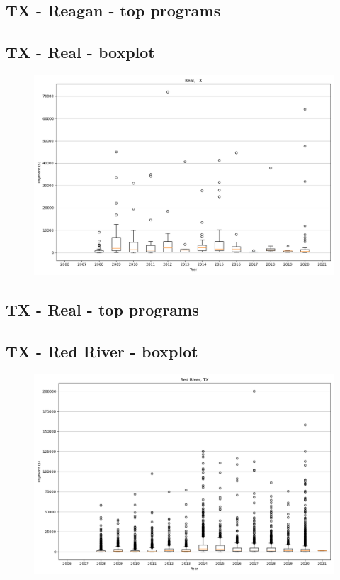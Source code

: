 \subsection*{TX - Reagan - top programs}

\newpage
\subsection*{TX - Real - boxplot}
\begin{figure}[h]
\centering
\includegraphics[width=7in]{../output/boxplots/counties/Real-TX_boxplot.png}
\end{figure}


\subsection*{TX - Real - top programs}

\newpage
\subsection*{TX - Red River - boxplot}
\begin{figure}[h]
\centering
\includegraphics[width=7in]{../output/boxplots/counties/Red River-TX_boxplot.png}
\end{figure}


